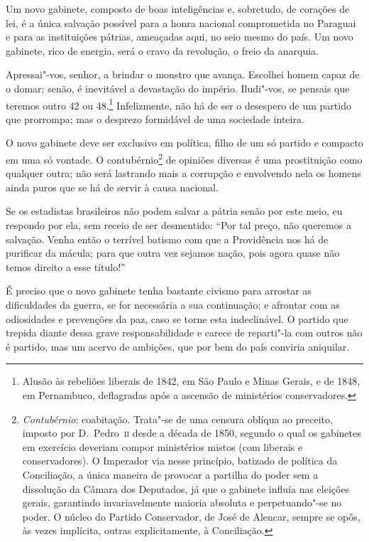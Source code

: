  Um novo gabinete, composto de boas inteligências e, sobretudo, de
corações de lei, é a única salvação possível para a honra nacional
comprometida no Paraguai e para as instituições pátrias, ameaçadas
aqui, no seio mesmo do país. Um novo gabinete, rico de energia, será o
cravo da revolução, o freio da anarquia.

 Apressai"-vos, senhor, a brindar o monstro que avança. Escolhei homem
capaz de o domar; senão, é inevitável a devastação do império.
Iludi"-vos, se pensais que teremos outro 42 ou
48.\footnote{ Alusão às rebeliões liberais de 1842, em São Paulo 
e Minas Gerais, e de 1848, em Pernambuco, deflagradas após a ascensão de ministérios conservadores.}
 Infelizmente, não há de ser o desespero de um partido que prorrompa;
mas o desprezo formidável de uma sociedade inteira.

 O novo gabinete deve ser exclusivo em política, filho de um só partido
e compacto em uma só vontade. O
contubérnio\footnote{ \textit{Contubérnio}: coabitação. Trata"-se de uma censura oblíqua ao preceito,
imposto por D.~Pedro~\textsc{ii} desde a década de 1850, segundo o qual os
gabinetes em exercício deveriam compor ministérios mistos (com liberais
e conservadores). O Imperador via nesse princípio, batizado de política
da Conciliação, a única maneira de provocar a partilha do poder sem a
dissolução da Câmara dos Deputados, já que o gabinete influía nas
eleições gerais, garantindo invariavelmente maioria absoluta e
perpetuando"-se no poder. O núcleo do Partido Conservador, de José de
Alencar, sempre se opôs, às vezes implícita, outras explicitamente, à
Conciliação.}
 de opiniões diversas é uma prostituição como qualquer outra; não será
lastrando mais a corrupção e envolvendo nela os homens ainda puros que
se há de servir à causa nacional. 

 Se os estadistas brasileiros não podem salvar a pátria senão por este
meio, eu respondo por ela, sem receio de ser desmentido: ``Por tal
preço, não queremos a salvação. Venha então o terrível batismo com que
a Providência nos há de purificar da mácula; para que outra vez sejamos
nação, pois agora quase não temos direito a esse título!''

 É preciso que o novo gabinete tenha bastante civismo para arrostar as
dificuldades da guerra, se for necessária a sua continuação; e afrontar
com as odiosidades e prevenções da paz, caso se torne esta
indeclinável. O partido que trepida diante dessa grave responsabilidade
e carece de reparti"-la com outros não é partido, mas um acervo de
ambições, que por bem do país conviria aniquilar.  

